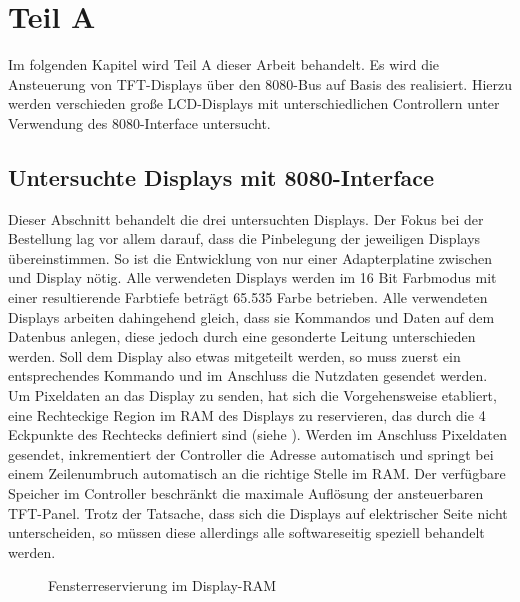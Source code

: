 \chapter{Teil A}
\label{cha:TeilA}
Im folgenden Kapitel wird Teil A dieser Arbeit behandelt. Es wird die Ansteuerung von TFT-Displays über den 8080-Bus auf Basis des  realisiert. Hierzu werden verschieden große LCD-Displays mit unterschiedlichen Controllern unter Verwendung des 8080-Interface untersucht. 

\section{Untersuchte Displays mit 8080-Interface}
Dieser Abschnitt behandelt die drei untersuchten Displays. Der Fokus bei der Bestellung lag vor allem darauf, dass die Pinbelegung der jeweiligen Displays übereinstimmen. So ist die Entwicklung von nur einer Adapterplatine zwischen  und Display nötig. Alle verwendeten Displays werden im 16 Bit Farbmodus mit einer resultierende Farbtiefe beträgt 65.535 Farbe betrieben.\newline %
Alle verwendeten Displays arbeiten dahingehend gleich, dass sie Kommandos und Daten auf dem Datenbus anlegen, diese jedoch durch eine gesonderte Leitung unterschieden werden. Soll dem Display also etwas mitgeteilt werden, so muss zuerst ein entsprechendes Kommando und im Anschluss die Nutzdaten gesendet werden. Um Pixeldaten an das Display zu senden, hat sich die Vorgehensweise etabliert, eine Rechteckige Region im RAM des Displays zu reservieren, das durch die 4 Eckpunkte des Rechtecks definiert sind (siehe ). Werden im Anschluss Pixeldaten gesendet, inkrementiert der Controller die Adresse automatisch und springt bei einem Zeilenumbruch automatisch an die richtige Stelle im RAM. Der verfügbare Speicher im Controller beschränkt die maximale Auflösung der ansteuerbaren TFT-Panel. Trotz der Tatsache, dass sich die Displays auf elektrischer Seite nicht unterscheiden, so müssen diese allerdings alle softwareseitig speziell behandelt werden.
\begin{figure}[h]
	\centering
{}
	\caption{Fensterreservierung im Display-RAM}
	\label{fig:ram_window}
\end{figure}
